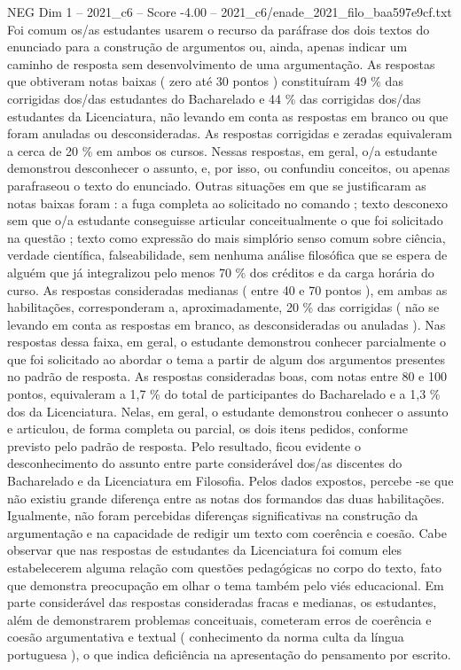 \begin{textsample}{NEG Dim 1 – 2021\_c6 – Score -4.00 – 2021\_c6/enade\_2021\_filo\_baa597e9cf.txt}
Foi comum os/as estudantes usarem o recurso da paráfrase dos dois textos do enunciado para a construção de argumentos ou, ainda, apenas indicar um caminho de resposta sem desenvolvimento de uma argumentação.
As respostas que obtiveram notas baixas ( zero até 30 pontos ) constituíram 49 \% das corrigidas dos/das estudantes do Bacharelado e 44 \% das corrigidas dos/das estudantes da Licenciatura, não levando em conta as respostas em branco ou que foram anuladas ou desconsideradas.
As respostas corrigidas e zeradas equivaleram a cerca de 20 \% em ambos os cursos.
Nessas respostas, em geral, o/a estudante demonstrou desconhecer o assunto, e, por isso, ou confundiu conceitos, ou apenas parafraseou o texto do enunciado.
Outras situações em que se justificaram as notas baixas foram : a fuga completa ao solicitado no comando ; texto desconexo sem que o/a estudante conseguisse articular conceitualmente o que foi solicitado na questão ; texto como expressão do mais simplório senso comum sobre ciência, verdade científica, falseabilidade, sem nenhuma análise filosófica que se espera de alguém que já integralizou pelo menos 70 \% dos créditos e da carga horária do curso.
As respostas consideradas medianas ( entre 40 e 70 pontos ), em ambas as habilitações, corresponderam a, aproximadamente, 20 \% das corrigidas ( não se levando em conta as respostas em branco, as desconsideradas ou anuladas ).
Nas respostas dessa faixa, em geral, o estudante demonstrou conhecer parcialmente o que foi solicitado ao abordar o tema a partir de algum dos argumentos presentes no padrão de resposta.
As respostas consideradas boas, com notas entre 80 e 100 pontos, equivaleram a 1,7 \% do total de participantes do Bacharelado e a 1,3 \% dos da Licenciatura.
Nelas, em geral, o estudante demonstrou conhecer o assunto e articulou, de forma completa ou parcial, os dois itens pedidos, conforme previsto pelo padrão de resposta.
Pelo resultado, ficou evidente o desconhecimento do assunto entre parte considerável dos/as discentes do Bacharelado e da Licenciatura em Filosofia.
Pelos dados expostos, percebe -se que não existiu grande diferença entre as notas dos formandos das duas habilitações.
Igualmente, não foram percebidas diferenças significativas na construção da argumentação e na capacidade de redigir um texto com coerência e coesão.
Cabe observar que nas respostas de estudantes da Licenciatura foi comum eles estabelecerem alguma relação com questões pedagógicas no corpo do texto, fato que demonstra preocupação em olhar o tema também pelo viés educacional.
Em parte considerável das respostas consideradas fracas e medianas, os estudantes, além de demonstrarem problemas conceituais, cometeram erros de coerência e coesão argumentativa e textual ( conhecimento da norma culta da língua portuguesa ), o que indica deficiência na apresentação do pensamento por escrito.

\end{textsample}
